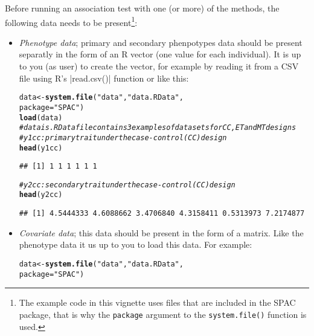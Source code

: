 \documentclass{article}\usepackage[]{graphicx}\usepackage[]{color}
\makeatletter
\newcommand{\hlstr}[1]{\textcolor[rgb]{0.192,0.494,0.8}{#1}}%
\newcommand{\hlcom}[1]{\textcolor[rgb]{0.678,0.584,0.686}{\textit{#1}}}%
\newcommand{\hlstd}[1]{\textcolor[rgb]{0.345,0.345,0.345}{#1}}%
\newcommand{\hlkwb}[1]{\textcolor[rgb]{0.69,0.353,0.396}{#1}}%
\newcommand{\hlkwc}[1]{\textcolor[rgb]{0.333,0.667,0.333}{#1}}%
\newcommand{\hlkwd}[1]{\textcolor[rgb]{0.737,0.353,0.396}{\textbf{#1}}}%
\newenvironment{kframe}{%
 \def\at@end@of@kframe{}%
 \ifinner\ifhmode%
  \def\at@end@of@kframe{\end{minipage}}%
  \begin{minipage}{\columnwidth}%
 \fi\fi%
 \def\FrameCommand##1{\hskip\@totalleftmargin \hskip-\fboxsep
 \colorbox{shadecolor}{##1}\hskip-\fboxsep
     \hskip-\linewidth \hskip-\@totalleftmargin \hskip\columnwidth}%
 \MakeFramed {\advance\hsize-\width
   \@totalleftmargin\z@ \linewidth\hsize
   \@setminipage}}%
 {\par\unskip\endMakeFramed%
 \at@end@of@kframe}
\newenvironment{knitrout}{}{} %
\makeatother
\begin{document}
Before running an association test with one (or more) of the methods,
the following data needs to be present\footnote{The example code in
  this vignette uses files that are included in the SPAC
  package, that is why the \lstinline{package} argument to the
  \lstinline{system.file()} function is used.}:
\begin{itemize}
\item \emph{Phenotype data}; primary and secondary phenpotypes data should be present separatly in the form of
  an R vector (one value for each individual). It is up to you (as user)
  to create the vector, for example by reading it from a CSV file using R's
  |read.csv()| function or like this:
\begin{knitrout}
\color{fgcolor}\begin{kframe}
\begin{alltt}
  \hlstd{data} \hlkwb{<-} \hlkwd{system.file}\hlstd{(}\hlstr{"data"}\hlstd{,}\hlstr{"data.RData"}\hlstd{,}
                            \hlkwc{package}\hlstd{=}\hlstr{"SPAC"}\hlstd{)}
  \hlkwd{load}\hlstd{(data)}
\hlcom{# data is .RData file contains 3 examples of data sets for CC, ET and MT designs}
\hlcom{# y1cc: primary trait under the case-control (CC) design}
  \hlkwd{head}\hlstd{(y1cc)}
\end{alltt}
\begin{verbatim}
## [1] 1 1 1 1 1 1
\end{verbatim}
\begin{alltt}
\hlcom{# y2cc: secondary trait under the case-control (CC) design}
  \hlkwd{head}\hlstd{(y2cc)}
\end{alltt}
\begin{verbatim}
## [1] 4.5444333 4.6088662 3.4706840 4.3158411 0.5313973 7.2174877
\end{verbatim}
\end{kframe}
\end{knitrout}
\item \emph{Covariate data}; this data should be present in the form
  of a matrix. Like the phenotype data it us up to you to load this
  data. For example:
\begin{knitrout}
\color{fgcolor}\begin{kframe}
\begin{alltt}
  \hlstd{data} \hlkwb{<-} \hlkwd{system.file}\hlstd{(}\hlstr{"data"}\hlstd{,}\hlstr{"data.RData"}\hlstd{,}
                            \hlkwc{package}\hlstd{=}\hlstr{"SPAC"}\hlstd{)}

\end{alltt}
\end{kframe}
\end{knitrout}
\end{itemize}
\end{document}
